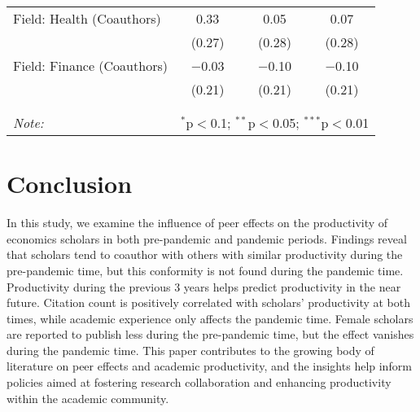 \begin{table}[!htbp]
\begin{tabular}{lccc}
  Field: Health (Coauthors) & 0.33 & 0.05 & 0.07 \\ 
  & (0.27) & (0.28) & (0.28) \\
  Field: Finance (Coauthors) & $-$0.03 & $-$0.10 & $-$0.10 \\ 
  & (0.21) & (0.21) & (0.21) \\
 \hline \\[-1.8ex] 
\hline \\[-1.8ex] 
\textit{Note:}  & \multicolumn{3}{r}{$^{*}$p$<$0.1; $^{**}$p$<$0.05; $^{***}$p$<$0.01} \\ 
\end{tabular}
\end{table} 

\section{Conclusion}
In this study, we examine the influence of peer effects on the productivity of economics scholars in both pre-pandemic and pandemic periods. Findings reveal that scholars tend to coauthor with others with similar productivity during the pre-pandemic time, but this conformity is not found during the pandemic time. Productivity during the previous 3 years helps predict productivity in the near future. Citation count is positively correlated with scholars' productivity at both times, while academic experience only affects the pandemic time. Female scholars are reported to publish less during the pre-pandemic time, but the effect vanishes during the pandemic time. This paper contributes to the growing body of literature on peer effects and academic productivity, and the insights help inform policies aimed at fostering research collaboration and enhancing productivity within the academic community.

